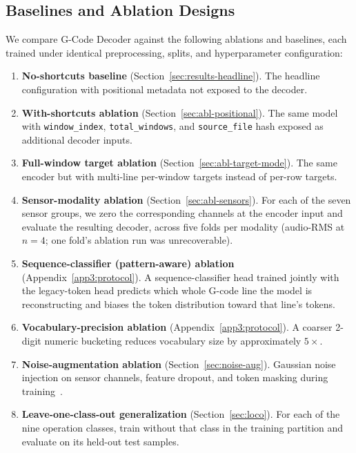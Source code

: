\documentclass[sensors,article,submit,moreauthors,pdftex]{Definitions/mdpi}
\newcommand{\modelname}{G-Code Decoder}
\begin{document}
\subsection{Baselines and Ablation Designs}
\label{sec:ablations-design}

We compare \modelname{} against the following ablations and baselines, each trained under identical preprocessing, splits, and hyperparameter configuration:

\begin{enumerate}
\item \textbf{No-shortcuts baseline} (Section~\ref{sec:results-headline}). The headline configuration with positional metadata not exposed to the decoder.
\item \textbf{With-shortcuts ablation} (Section~\ref{sec:abl-positional}). The same model with \texttt{window\_index}, \texttt{total\_windows}, and \texttt{source\_file} hash exposed as additional decoder inputs.
\item \textbf{Full-window target ablation} (Section~\ref{sec:abl-target-mode}). The same encoder but with multi-line per-window targets instead of per-row targets.
\item \textbf{Sensor-modality ablation} (Section~\ref{sec:abl-sensors}). For each of the seven sensor groups, we zero the corresponding channels at the encoder input and evaluate the resulting decoder, across five folds per modality (audio-RMS at $n=4$; one fold's ablation run was unrecoverable).
\item \textbf{Sequence-classifier (pattern-aware) ablation} (Appendix~\ref{app3:protocol}). A sequence-classifier head trained jointly with the legacy-token head predicts which whole G-code line the model is reconstructing and biases the token distribution toward that line's tokens.
\item \textbf{Vocabulary-precision ablation} (Appendix~\ref{app3:protocol}). A coarser 2-digit numeric bucketing reduces vocabulary size by approximately $5\times$.
\item \textbf{Noise-augmentation ablation} (Section~\ref{sec:noise-aug}). Gaussian noise injection on sensor channels, feature dropout, and token masking during training~\cite{srivastava2014dropout,jia2016deep,meyes2019ablation}.
\item \textbf{Leave-one-class-out generalization} (Section~\ref{sec:loco}). For each of the nine operation classes, train without that class in the training partition and evaluate on its held-out test samples.
\end{enumerate}
\end{document}
